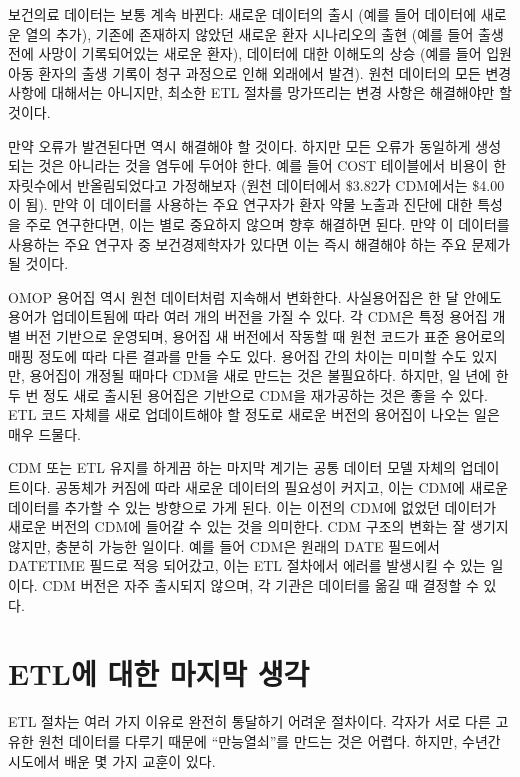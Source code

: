 \documentclass[10.5pt]{book}
\theoremstyle{definition}
\theoremstyle{definition}
\theoremstyle{definition}
\theoremstyle{remark}
\begin{document}
보건의료 데이터는 보통 계속 바뀐다: 새로운 데이터의 출시 (예를 들어
데이터에 새로운 열의 추가), 기존에 존재하지 않았던 새로운 환자
시나리오의 출현 (예를 들어 출생 전에 사망이 기록되어있는 새로운 환자),
데이터에 대한 이해도의 상승 (예를 들어 입원 아동 환자의 출생 기록이 청구
과정으로 인해 외래에서 발견). 원천 데이터의 모든 변경 사항에 대해서는
아니지만, 최소한 ETL 절차를 망가뜨리는 변경 사항은 해결해야만 할 것이다.

만약 오류가 발견된다면 역시 해결해야 할 것이다. 하지만 모든 오류가
동일하게 생성되는 것은 아니라는 것을 염두에 두어야 한다. 예를 들어 COST
테이블에서 비용이 한 자릿수에서 반올림되었다고 가정해보자 (원천
데이터에서 \$3.82가 CDM에서는 \$4.00이 됨). 만약 이 데이터를 사용하는
주요 연구자가 환자 약물 노출과 진단에 대한 특성을 주로 연구한다면, 이는
별로 중요하지 않으며 향후 해결하면 된다. 만약 이 데이터를 사용하는 주요
연구자 중 보건경제학자가 있다면 이는 즉시 해결해야 하는 주요 문제가 될
것이다.

OMOP 용어집 역시 원천 데이터처럼 지속해서 변화한다. 사실용어집은 한 달
안에도 용어가 업데이트됨에 따라 여러 개의 버전을 가질 수 있다. 각 CDM은
특정 용어집 개별 버전 기반으로 운영되며, 용어집 새 버전에서 작동할 때
원천 코드가 표준 용어로의 매핑 정도에 따라 다른 결과를 만들 수도 있다.
용어집 간의 차이는 미미할 수도 있지만, 용어집이 개정될 때마다 CDM을 새로
만드는 것은 불필요하다. 하지만, 일 년에 한두 번 정도 새로 출시된
용어집은 기반으로 CDM을 재가공하는 것은 좋을 수 있다. ETL 코드 자체를
새로 업데이트해야 할 정도로 새로운 버전의 용어집이 나오는 일은 매우
드물다.

CDM 또는 ETL 유지를 하게끔 하는 마지막 계기는 공통 데이터 모델 자체의
업데이트이다. 공동체가 커짐에 따라 새로운 데이터의 필요성이 커지고, 이는
CDM에 새로운 데이터를 추가할 수 있는 방향으로 가게 된다. 이는 이전의
CDM에 없었던 데이터가 새로운 버전의 CDM에 들어갈 수 있는 것을 의미한다.
CDM 구조의 변화는 잘 생기지 않지만, 충분히 가능한 일이다. 예를 들어
CDM은 원래의 DATE 필드에서 DATETIME 필드로 적응 되어갔고, 이는 ETL
절차에서 에러를 발생시킬 수 있는 일이다. CDM 버전은 자주 출시되지
않으며, 각 기관은 데이터를 옮길 때 결정할 수 있다.

\section{ETL에 대한 마지막 생각}\label{etl---}

ETL 절차는 여러 가지 이유로 완전히 통달하기 어려운 절차이다. 각자가 서로
다른 고유한 원천 데이터를 다루기 때문에 ``만능열쇠''를 만드는 것은
어렵다. 하지만, 수년간 시도에서 배운 몇 가지 교훈이 있다.
\end{document}

